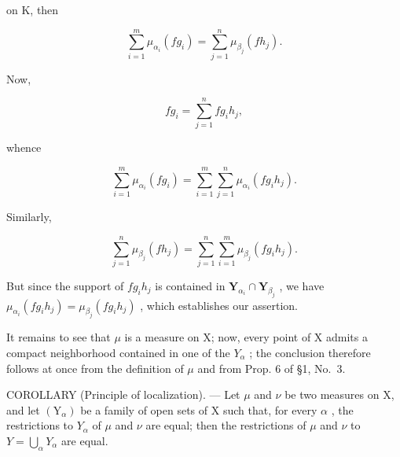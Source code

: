 on K, then

\[
\sum_ {i = 1} ^ {m} \mu_ {\alpha_ {i}} (f g _ {i}) = \sum_ {j = 1} ^ {n} \mu_ {\beta_ {j}} (f h _ {j}).
\]

Now,

\[
f g _ {i} = \sum_ {j = 1} ^ {n} f g _ {i} h _ {j},
\]

whence

\[
\sum_ {i = 1} ^ {m} \mu_ {\alpha_ {i}} (f g _ {i}) = \sum_ {i = 1} ^ {m} \sum_ {j = 1} ^ {n} \mu_ {\alpha_ {i}} (f g _ {i} h _ {j}).
\]

Similarly,

\[
\sum_ {j = 1} ^ {n} \mu_ {\beta_ {j}} (f h _ {j}) = \sum_ {j = 1} ^ {n} \sum_ {i = 1} ^ {m} \mu_ {\beta_ {j}} (f g _ {i} h _ {j}).
\]

But since the support of \(fg_{i}h_{j}\) is contained in \(\mathbf{Y}_{\alpha_i}\cap \mathbf{Y}_{\beta_j}\) , we have \(\mu_{\alpha_i}(fg_i h_j) = \mu_{\beta_j}(fg_i h_j)\) , which establishes our assertion.

It remains to see that \(\mu\) is a measure on X; now, every point of X admits a compact neighborhood contained in one of the \(Y_{\alpha}\) ; the conclusion therefore follows at once from the definition of \(\mu\) and from Prop. 6 of §1, No.~3.

COROLLARY (Principle of localization). --- Let \(\mu\) and \(\nu\) be two measures on X, and let \((\mathrm{Y}_{\alpha})\) be a family of open sets of X such that, for every \(\alpha\) , the restrictions to \(Y_{\alpha}\) of \(\mu\) and \(\nu\) are equal; then the restrictions of \(\mu\) and \(\nu\) to \(Y = \bigcup_{\alpha} Y_{\alpha}\) are equal.

